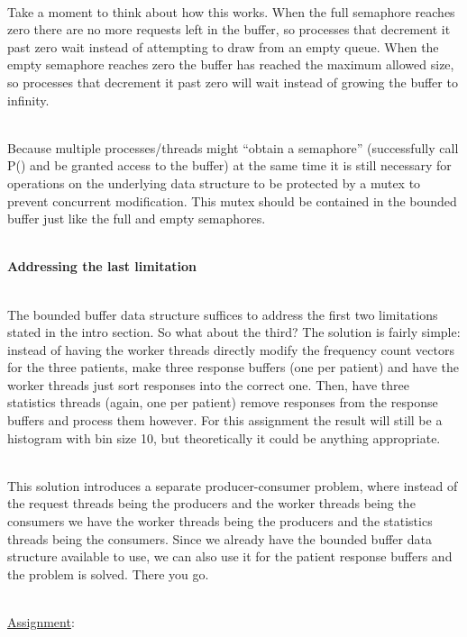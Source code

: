 \documentclass[12pt]{extarticle}
\newenvironment{myindentpar}[1]%
 {\begin{list}{}%
         {\setlength{\leftmargin}{#1}}%
         \item[]%
 }
 {\end{list}}
\begin{document}
\begin{myindentpar}{5mm}
	\ \\
	Take a moment to think about how this works. When the full semaphore reaches zero there are no more requests left in the buffer, so processes that decrement it past zero wait instead of attempting to draw from an empty queue. When the empty semaphore reaches zero the buffer has reached the maximum allowed size, so processes that decrement it past zero will wait instead of growing the buffer to infinity. 
	
	\ \\
	Because multiple processes/threads might “obtain a semaphore” (successfully call P() and be granted access to the buffer) at the same time it is still necessary for operations on the underlying data structure to be protected by a mutex to prevent concurrent modification. This mutex should be contained in the bounded buffer just like the full and empty semaphores.

	\ \\
    \textbf{Addressing the last limitation}
    
    \ \\
	The bounded buffer data structure suffices to address the first two limitations stated in the intro section. So what about the third? The solution is fairly simple: instead of having the worker threads directly modify the frequency count vectors for the three patients, make three response buffers (one per patient) and have the worker threads just sort responses into the correct one. Then, have three statistics threads (again, one per patient) remove responses from the response buffers and process them however. For this assignment the result will still be a histogram with bin size 10, but theoretically it could be anything appropriate.
	
	\ \\
	This solution introduces a separate producer-consumer problem, where instead of the request threads being the producers and the worker threads being the consumers we have the worker threads being the producers and the statistics threads being the consumers. Since we already have the bounded buffer data structure available to use, we can also use it for the patient response buffers and the problem is solved. There you go.	
	
\end{myindentpar}

\ \\
{\large \underline{Assignment}:}
\end{document}
